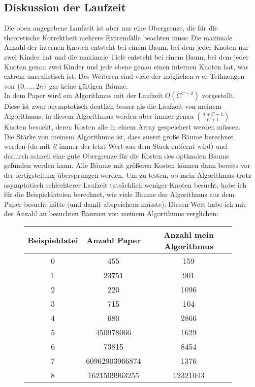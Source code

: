\documentclass[a4paper,10pt,ngerman]{scrartcl}
\begin{document}
    \subsection{Diskussion der Laufzeit}
    Die oben angegebene Laufzeit ist aber nur eine Obergrenze, die für die theoretische Korrektheit mehrere Extremfälle beachten muss:
    Die maximale Anzahl der internen Knoten entsteht bei einem Baum, bei dem jeder Knoten nur zwei Kinder hat und die maximale Tiefe entsteht bei einem Baum, bei dem jeder Knoten genau zwei Kinder und jede ebene genau einen internen Knoten hat, was extrem unrealistisch ist.
    Des Weiteren sind viele der möglichen $n$-er Teilmengen von $\{0, \dots, 2n\}$ gar keine gültigen Bäume. \\
    In dem Paper\autocite{golin_dynamic_1998} wird ein Algorithmus mit der Laufzeit $O(C^{C+2})$ vorgestellt.
    Diese ist zwar asymptotisch deutlich besser als die Laufzeit von meinem Algorithmus, in diesem Algorithmus werden aber
    immer genau ${n + C + 1}\choose {C+ 1}$ Knoten besucht, deren Kosten alle in einem Array gespeichert werden müssen.
    Die Stärke von meinem Algorithmus ist, dass zuerst große Bäume berechnet werden (da mit \textit{it} immer der letzt Wert aus dem Stack entfernt wird) und dadurch schnell eine gute Obergrenze für die Kosten des optimalen Baums gefunden werden kann.
    Alle Bäume mit größeren Kosten können dann bereits vor der fertigstellung übersprungen werden.
    Um zu testen, ob mein Algorithmus trotz asymptotisch schlechterer Laufzeit tatsächlich weniger Knoten besucht, habe
    ich für die Beispieldateien berechnet, wie viele Bäume der Algorithmus aus dem Paper besucht hätte (und damit abspeichern müsste).
    Diesen Wert habe ich mit der Anzahl an besuchten Bäumen von meinem Algorithmus verglichen:
    \begin{figure}[H]
        \centering
        \begin{tabular}{c |c | c}
            Beispieldatei & Anzahl Paper   & Anzahl mein Algorithmus \\
            \hline
            0             & 455            & 159                     \\
            1             & 23751          & 901                     \\
            2             & 220            & 1096                    \\
            3             & 715            & 104                     \\
            4             & 680            & 2866                    \\
            5             & 450978066      & 1629                    \\
            6             & 73815          & 8454                    \\
            7             & 60962903966874 & 1376                    \\
            8             & 1621509963255  & 12321043                \\
        \end{tabular}
    \end{figure}
\end{document}
